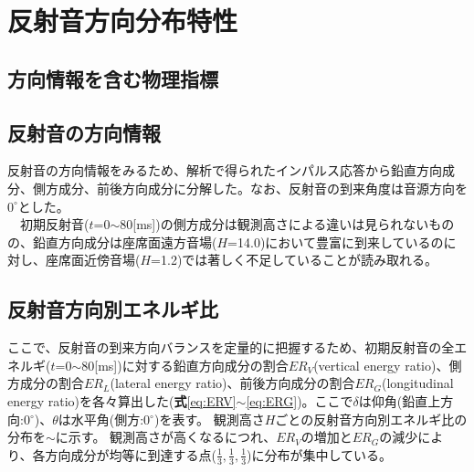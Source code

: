 \chapter{反射音方向分布特性}

\section{方向情報を含む物理指標}

\section{反射音の方向情報}
反射音の方向情報をみるため、解析で得られたインパルス応答から鉛直方向成分、側方成分、前後方向成分に分解した。なお、反射音の到来角度は音源方向を$0^\circ$とした。
\\　初期反射音($t$=0$\sim$80[ms])の側方成分は観測高さによる違いは見られないものの、鉛直方向成分は座席面遠方音場($H$=14.0)において豊富に到来しているのに対し、座席面近傍音場($H$=1.2)では著しく不足していることが読み取れる。



\section{反射音方向別エネルギ比}
ここで、反射音の到来方向バランスを定量的に把握するため、初期反射音の全エネルギ($t$=0$\sim$80[ms])に対する鉛直方向成分の割合$ER_V$(vertical energy ratio)、側方成分の割合$ER_L$(lateral energy ratio)、前後方向成分の割合$ER_G$(longitudinal energy ratio)を各々算出した(\textbf{式}\ref{eq:ERV}$\sim$\ref{eq:ERG})。ここで$\delta$は仰角(鉛直上方向:0$^\circ$)、$\theta$は水平角(側方:0$^\circ$)を表す。
観測高さ$H$ごとの反射音方向別エネルギ比の分布を$\sim$に示す。
観測高さが高くなるにつれ、$ER_V$の増加と$ER_G$の減少により、各方向成分が均等に到達する点($\frac{1}{3},\frac{1}{3},\frac{1}{3}$)に分布が集中している。

